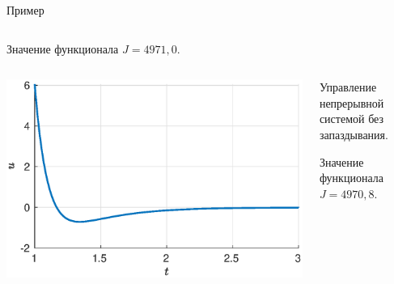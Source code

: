 \begin{frame}{Пример}
\begin{columns}
\begin{column}{0.55\textwidth}
                                Значение функционала $J = 4971,\!0$.
                        \end{column}
                \end{columns}
                \begin{columns}
                        \begin{column}{0.45\textwidth}
                                \includegraphics[width=1.15\textwidth]{content/example/simple-control.eps}
                        \end{column}
                        \begin{column}{0.55\textwidth}
                                Управление непрерывной системой без запаздывания.

                                \vspace{0.2cm}

                                Значение функционала $J = 4970,\!8$.
                        \end{column}
                \end{columns}
        \end{frame}
